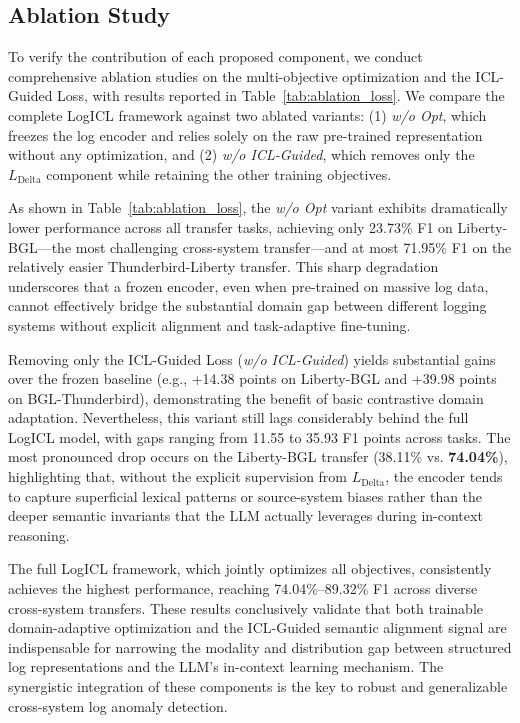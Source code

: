 \documentclass[lettersize,journal]{IEEEtran}
\begin{document}
\subsection{Ablation Study}
To verify the contribution of each proposed component, we conduct comprehensive ablation studies on the multi-objective optimization and the ICL-Guided Loss, with results reported in Table~\ref{tab:ablation_loss}. We compare the complete LogICL framework against two ablated variants: (1) \textit{w/o Opt}, which freezes the log encoder and relies solely on the raw pre-trained representation without any optimization, and (2) \textit{w/o ICL-Guided}, which removes only the $L_{\text{Delta}}$ component while retaining the other training objectives.

As shown in Table~\ref{tab:ablation_loss}, the \textit{w/o Opt} variant exhibits dramatically lower performance across all transfer tasks, achieving only 23.73\% F1 on Liberty-BGL—the most challenging cross-system transfer—and at most 71.95\% F1 on the relatively easier Thunderbird-Liberty transfer. This sharp degradation underscores that a frozen encoder, even when pre-trained on massive log data, cannot effectively bridge the substantial domain gap between different logging systems without explicit alignment and task-adaptive fine-tuning.

Removing only the ICL-Guided Loss (\textit{w/o ICL-Guided}) yields substantial gains over the frozen baseline (e.g., +14.38 points on Liberty-BGL and +39.98 points on BGL-Thunderbird), demonstrating the benefit of basic contrastive domain adaptation. Nevertheless, this variant still lags considerably behind the full LogICL model, with gaps ranging from 11.55 to 35.93 F1 points across tasks. The most pronounced drop occurs on the Liberty-BGL transfer (38.11\% vs. \textbf{74.04\%}), highlighting that, without the explicit supervision from $L_{\text{Delta}}$, the encoder tends to capture superficial lexical patterns or source-system biases rather than the deeper semantic invariants that the LLM actually leverages during in-context reasoning.

The full LogICL framework, which jointly optimizes all objectives, consistently achieves the highest performance, reaching 74.04\%–89.32\% F1 across diverse cross-system transfers. These results conclusively validate that both trainable domain-adaptive optimization and the ICL-Guided semantic alignment signal are indispensable for narrowing the modality and distribution gap between structured log representations and the LLM’s in-context learning mechanism. The synergistic integration of these components is the key to robust and generalizable cross-system log anomaly detection.
\end{document}

